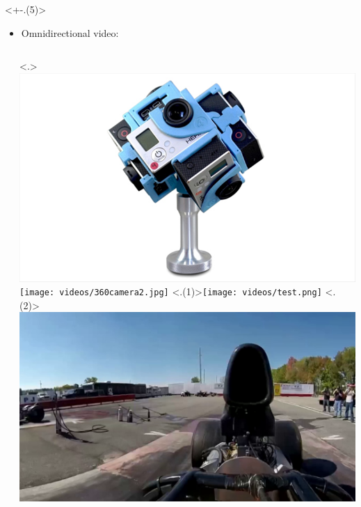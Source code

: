 \begin{frame}[c]
   \vfill
   \begin{minipage}[t][7cm][t]{\textwidth}
      \only<+-.(5)>{
         \begin{itemize}[<.->]
            \item Omnidirectional video:
         \end{itemize}
         \begin{columns}[T]
            \begin{column}{0.5\linewidth}
               \begin{independentCounter}
                  
               \end{independentCounter}
            \end{column}
            \begin{column}{0.5\linewidth}
               \only<.>{
                  \includegraphics[scale=0.15]{videos/360camera1.png}
                  \texttt{[image: videos/360camera2.jpg]}
                  \setcounter{tmpCounter}{\value{beamerpauses}}
               }
               \only<.(1)>{\hspace{2cm}\texttt{[image: videos/test.png]}}
               \only<.(2)>{\hspace{2cm}\includegraphics[scale=0.065]{videos/fov1.png}}

\end{column}
\end{columns}}
\end{minipage}
\end{frame}
